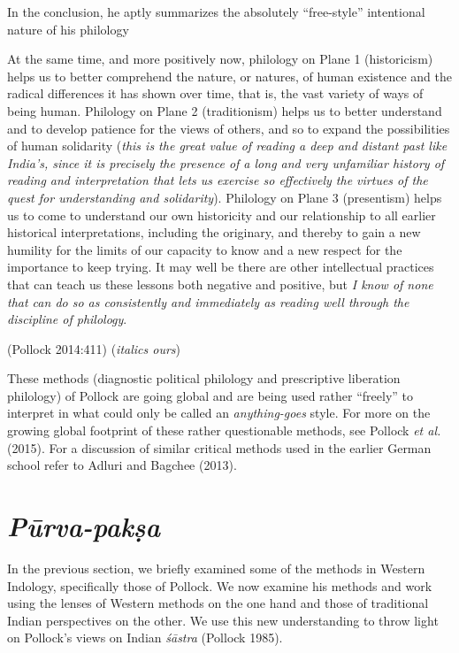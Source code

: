 In the conclusion, he aptly summarizes the absolutely ``free-style'' intentional nature of his philology
\begin{myquote}
At the same time, and more positively now, philology on Plane 1 (historicism) helps us to better comprehend the nature, or natures, of human existence and the radical differences it has shown over time, that is, the vast variety of ways of being human. Philology on Plane 2 (traditionism) helps us to better understand and to develop patience for the views of others, and so to expand the possibilities of human solidarity ({\sl this is the great value of reading a deep and distant past like India's, since it is precisely the presence of a long and very unfamiliar history of reading and interpretation that lets us exercise so effectively the virtues of the quest for understanding and solidarity}). Philology on Plane 3 (presentism) helps us to come to understand our own historicity and our relationship to all earlier historical interpretations, including the originary, and thereby to gain a new humility for the limits of our capacity to know and a new respect for the importance to keep trying. It may well be there are other intellectual practices that can teach us these lessons both negative and positive, but {\sl I know of none that can do so as consistently and immediately as reading well through the discipline of philology}. 

\hfill (Pollock 2014:411) ({\sl italics ours})
\end{myquote}

These methods (diagnostic political philology and prescriptive liberation philology) of Pollock are going global and are being used rather ``freely'' to interpret in what could only be called an {\sl anything-goes} style. For more on the growing global footprint of these rather questionable methods, see Pollock {\sl et al.} (2015). For a discussion of similar critical methods used in the earlier German school refer to Adluri and Bagchee (2013).\\[-22pt]

\section*{{\sl\bfseries Pūrva-pakṣa}}

In the previous section, we briefly examined some of the methods in Western Indology, specifically those of Pollock.  We now examine his methods and work using the lenses of Western methods on the one hand and those of traditional Indian perspectives on the other. We use this new understanding to throw light on Pollock's views on Indian {\sl śāstra} (Pollock 1985).

